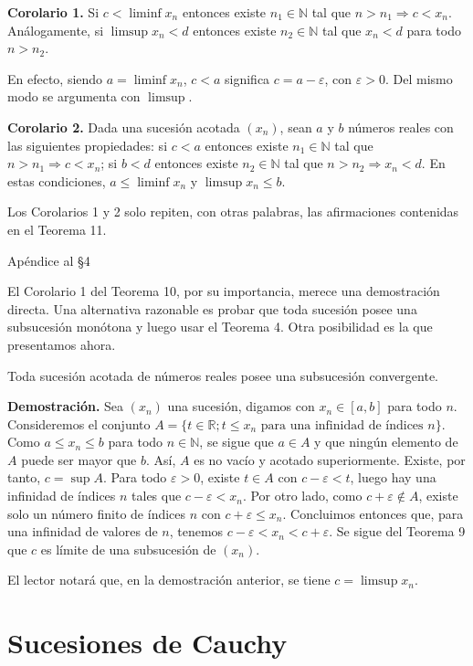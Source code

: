 \documentclass[12pt,oneside]{book}
\begin{document}
\textbf{Corolario 1.} Si \(c < \liminf x_n\) entonces existe \(n_1 \in \mathbb{N}\) tal que \(n > n_1 \Rightarrow c < x_n\). Análogamente, si \(\limsup x_n < d\) entonces existe \(n_2 \in \mathbb{N}\) tal que \(x_n < d\) para todo \(n > n_2\).

En efecto, siendo \(a = \liminf x_n\), \(c < a\) significa \(c = a - \varepsilon\), con \(\varepsilon > 0\). Del mismo modo se argumenta con \(\limsup\).

\textbf{Corolario 2.} Dada una sucesión acotada \((x_n)\), sean \(a\) y \(b\) números reales con las siguientes propiedades: si \(c < a\) entonces existe \(n_1 \in \mathbb{N}\) tal que \(n > n_1 \Rightarrow c < x_n\); si \(b < d\) entonces existe \(n_2 \in \mathbb{N}\) tal que \(n > n_2 \Rightarrow x_n < d\). En estas condiciones, \(a \leq \liminf x_n\) y \(\limsup x_n \leq b\).

Los Corolarios 1 y 2 solo repiten, con otras palabras, las afirmaciones contenidas en el Teorema 11.

Apéndice al §4

El Corolario 1 del Teorema 10, por su importancia, merece una demostración directa. Una alternativa razonable es probar que toda sucesión posee una subsucesión monótona y luego usar el Teorema 4. Otra posibilidad es la que presentamos ahora.

Toda sucesión acotada de números reales posee una subsucesión convergente.

\textbf{Demostración.} Sea \((x_n)\) una sucesión, digamos con \(x_n \in [a, b]\) para todo \(n\). Consideremos el conjunto \(A = \{t \in \mathbb{R}; t \leq x_n \text{ para una infinidad de índices } n\}\). Como \(a \leq x_n \leq b\) para todo \(n \in \mathbb{N}\), se sigue que \(a \in A\) y que ningún elemento de \(A\) puede ser mayor que \(b\). Así, \(A\) es no vacío y acotado superiormente. Existe, por tanto, \(c = \sup A\). Para todo \(\varepsilon > 0\), existe \(t \in A\) con \(c - \varepsilon < t\), luego hay una infinidad de índices \(n\) tales que \(c - \varepsilon < x_n\). Por otro lado, como \(c + \varepsilon \notin A\), existe solo un número finito de índices \(n\) con \(c + \varepsilon \leq x_n\). Concluimos entonces que, para una infinidad de valores de \(n\), tenemos \(c - \varepsilon < x_n < c + \varepsilon\). Se sigue del Teorema 9 que \(c\) es límite de una subsucesión de \((x_n)\).

El lector notará que, en la demostración anterior, se tiene \(c = \limsup x_n\).

\section{Sucesiones de Cauchy}
\end{document}
